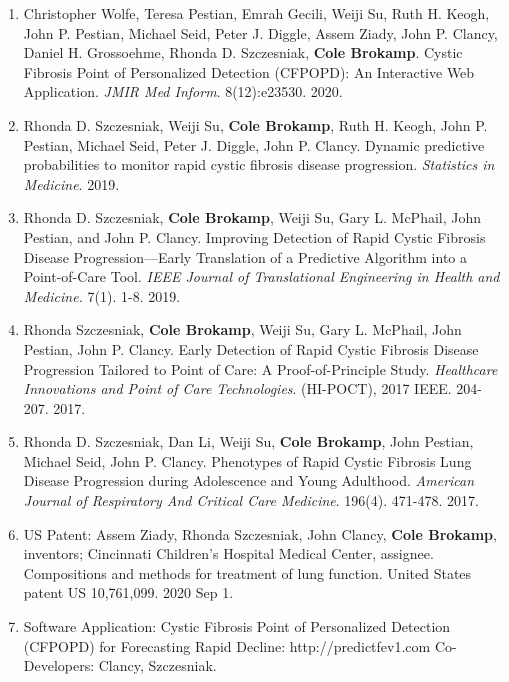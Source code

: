 \documentclass{nihbiosketch}
\begin{document}
\begin{enumerate}
\begin{enumerate}

  \item Christopher Wolfe, Teresa Pestian, Emrah Gecili, Weiji Su, Ruth H. Keogh, John P. Pestian, Michael Seid, Peter J. Diggle, Assem Ziady, John P. Clancy, Daniel H. Grossoehme, Rhonda D. Szczesniak, \textbf{Cole Brokamp}. Cystic Fibrosis Point of Personalized Detection (CFPOPD): An Interactive Web Application. \emph{JMIR Med Inform}. 8(12):e23530. 2020.

  \item Rhonda D. Szczesniak, Weiji Su, \textbf{Cole Brokamp}, Ruth H. Keogh,
  John P. Pestian, Michael Seid, Peter J. Diggle, John P. Clancy. Dynamic
  predictive probabilities to monitor rapid cystic fibrosis disease
  progression. \emph{Statistics in Medicine}. 2019.

	\item Rhonda D. Szczesniak, \textbf{Cole Brokamp}, Weiji Su, Gary L. McPhail,
    John Pestian, and John P. Clancy. Improving Detection of Rapid Cystic
    Fibrosis Disease Progression—Early Translation of a Predictive Algorithm
    into a Point-of-Care Tool. \textit{IEEE Journal of Translational Engineering
      in Health and Medicine.} 7(1). 1-8. 2019.

	\item Rhonda Szczesniak, \textbf{Cole Brokamp}, Weiji Su, Gary L. McPhail, John Pestian, John P. Clancy. Early Detection of Rapid Cystic Fibrosis Disease Progression Tailored to Point of Care: A Proof-of-Principle Study. \textit{Healthcare Innovations and Point of Care Technologies}. (HI-POCT), 2017 IEEE. 204-207. 2017.

	\item Rhonda D. Szczesniak, Dan Li, Weiji Su, \textbf{Cole Brokamp}, John Pestian, Michael Seid, John P. Clancy. Phenotypes of Rapid Cystic Fibrosis Lung Disease Progression during Adolescence and Young Adulthood. \textit{American Journal of Respiratory And Critical Care Medicine}. 196(4). 471-478. 2017.

\item US Patent: Assem Ziady, Rhonda Szczesniak, John Clancy, \textbf{Cole Brokamp}, inventors; Cincinnati Children's Hospital Medical Center, assignee. Compositions and methods for treatment of lung function. United States patent US 10,761,099. 2020 Sep 1.

  \item Software Application: Cystic Fibrosis Point of Personalized Detection (CFPOPD) for Forecasting Rapid Decline: http://predictfev1.com Co-Developers: Clancy, Szczesniak.
  
\end{enumerate}

\end{enumerate}
\end{document}
